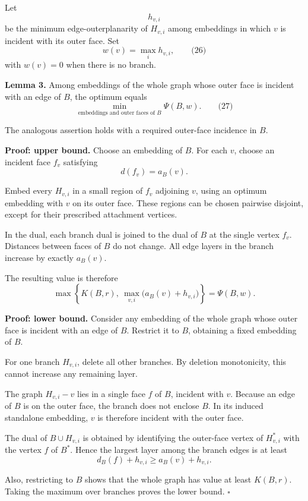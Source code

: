 \documentclass[
  11pt,
  a4paper,
]{article}
\begin{document}
Let \[
h_{v,i}
\] be the minimum edge-outerplanarity of \(H_{v,i}\) among embeddings in
which \(v\) is incident with its outer face. Set \[
w(v)=\max_i h_{v,i},
\qquad\text{(26)}
\] with \(w(v)=0\) when there is no branch.

\textbf{Lemma 3.} Among embeddings of the whole graph whose outer face
is incident with an edge of \(B\), the optimum equals \[
\min_{\text{embeddings and outer faces of }B}\Psi(B,w).
\qquad\text{(27)}
\]

The analogous assertion holds with a required outer-face incidence in
\(B\).

\textbf{Proof: upper bound.} Choose an embedding of \(B\). For each
\(v\), choose an incident face \(f_v\) satisfying \[
d(f_v)=a_B(v).
\]

Embed every \(H_{v,i}\) in a small region of \(f_v\) adjoining \(v\),
using an optimum embedding with \(v\) on its outer face. These regions
can be chosen pairwise disjoint, except for their prescribed attachment
vertices.

In the dual, each branch dual is joined to the dual of \(B\) at the
single vertex \(f_v\). Distances between faces of \(B\) do not change.
All edge layers in the branch increase by exactly \(a_B(v)\).

The resulting value is therefore \[
\max\left\{
K(B,r),\
\max_{v,i}\bigl(a_B(v)+h_{v,i}\bigr)
\right\}
=
\Psi(B,w).
\]

\textbf{Proof: lower bound.} Consider any embedding of the whole graph
whose outer face is incident with an edge of \(B\). Restrict it to
\(B\), obtaining a fixed embedding of \(B\).

For one branch \(H_{v,i}\), delete all other branches. By deletion
monotonicity, this cannot increase any remaining layer.

The graph \(H_{v,i}-v\) lies in a single face \(f\) of \(B\), incident
with \(v\). Because an edge of \(B\) is on the outer face, the branch
does not enclose \(B\). In its induced standalone embedding, \(v\) is
therefore incident with the outer face.

The dual of \(B\cup H_{v,i}\) is obtained by identifying the outer-face
vertex of \(H_{v,i}^*\) with the vertex \(f\) of \(B^*\). Hence the
largest layer among the branch edges is at least \[
d_B(f)+h_{v,i}
\ge
a_B(v)+h_{v,i}.
\]

Also, restricting to \(B\) shows that the whole graph has value at least
\(K(B,r)\). Taking the maximum over branches proves the lower bound.
\(\square\)
\end{document}
